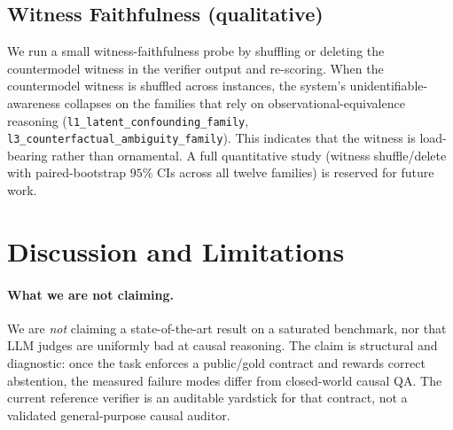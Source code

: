 \documentclass{article}
\theoremstyle{plain}
\theoremstyle{definition}
\theoremstyle{remark}
\begin{document}
\begin{table}[t]
\caption{OOD bucket breakdown for the full verifier. The rows are generated
  from \texttt{outputs/paper\_facing/ood\_table\_rows.tex}; CIs are bootstrap
  $95\%$ intervals over seed means.}
\label{tab:ood}
\vskip 0.05in
\begin{center}
\begin{small}
\begin{sc}
\end{sc}
\end{small}
\end{center}
\end{table}

\subsection{Witness Faithfulness (qualitative)}

We run a small witness-faithfulness probe by shuffling or deleting the
countermodel witness in the verifier output and re-scoring. When the
countermodel witness is shuffled across instances, the system's
unidentifiable-awareness collapses on the families that rely on
observational-equivalence reasoning
(\texttt{l1\_latent\_confounding\_family},
\texttt{l3\_counterfactual\_ambiguity\_family}). This indicates that the
witness is load-bearing rather than ornamental. A full quantitative study
(witness shuffle/delete with paired-bootstrap
$95\%$ CIs across all twelve families) is reserved for future work.

\section{Discussion and Limitations}
\label{sec:limitations}

\paragraph{What we are not claiming.}
We are \emph{not} claiming a state-of-the-art result on a saturated benchmark,
nor that LLM judges are uniformly bad at causal reasoning. The claim is
structural and diagnostic: once the task enforces a public/gold contract and
rewards correct abstention, the measured failure modes differ from closed-world
causal QA. The current reference verifier is an auditable yardstick for that
contract, not a validated general-purpose causal auditor.
\end{document}
